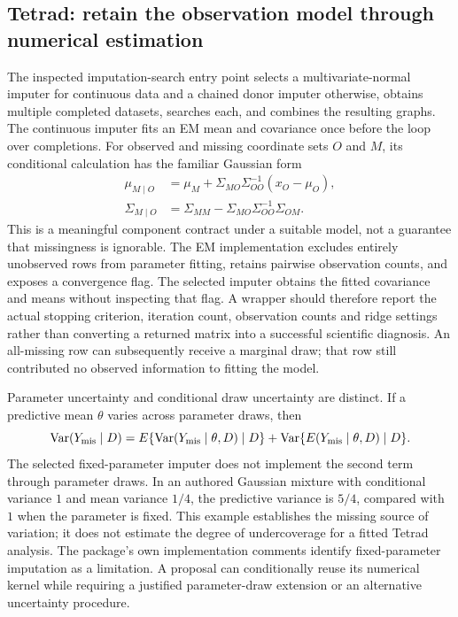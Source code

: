 \subsection*{Tetrad: retain the observation model through numerical estimation}
The inspected imputation-search entry point selects a multivariate-normal imputer for continuous data and a chained donor imputer otherwise, obtains multiple completed datasets, searches each, and combines the resulting graphs. The continuous imputer fits an EM mean and covariance once before the loop over completions. For observed and missing coordinate sets $O$ and $M$, its conditional calculation has the familiar Gaussian form
\begin{align*}
 \mu_{M\mid O}&=\mu_M+\Sigma_{MO}\Sigma_{OO}^{-1}(x_O-\mu_O),\\
 \Sigma_{M\mid O}&=\Sigma_{MM}-\Sigma_{MO}\Sigma_{OO}^{-1}\Sigma_{OM}.
\end{align*}
This is a meaningful component contract under a suitable model, not a guarantee that missingness is ignorable. The EM implementation excludes entirely unobserved rows from parameter fitting, retains pairwise observation counts, and exposes a convergence flag. The selected imputer obtains the fitted covariance and means without inspecting that flag. A wrapper should therefore report the actual stopping criterion, iteration count, observation counts and ridge settings rather than converting a returned matrix into a successful scientific diagnosis. An all-missing row can subsequently receive a marginal draw; that row still contributed no observed information to fitting the model.\citep{exec25_jtm_tetrad}

Parameter uncertainty and conditional draw uncertainty are distinct. If a predictive mean $\theta$ varies across parameter draws, then
\[
 \operatorname{Var}(Y_{\rm mis}\mid D)
 =E\{\operatorname{Var}(Y_{\rm mis}\mid\theta,D)\mid D\}
  +\operatorname{Var}\{E(Y_{\rm mis}\mid\theta,D)\mid D\}.
\]
The selected fixed-parameter imputer does not implement the second term through parameter draws. In an authored Gaussian mixture with conditional variance $1$ and mean variance $1/4$, the predictive variance is $5/4$, compared with $1$ when the parameter is fixed. This example establishes the missing source of variation; it does not estimate the degree of undercoverage for a fitted Tetrad analysis. The package's own implementation comments identify fixed-parameter imputation as a limitation. A proposal can conditionally reuse its numerical kernel while requiring a justified parameter-draw extension or an alternative uncertainty procedure.\citep{exec25_jtm_tetrad,exec25_jtm_choice}

